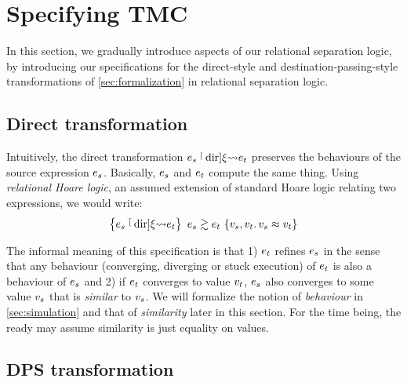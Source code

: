 \section{Specifying TMC}
\label{sec:specification}

In this section, we gradually introduce aspects of our relational separation logic, by introducing our specifications for the direct-style and destination-passing-style transformations of \cref{sec:formalization} in relational separation logic.

\subsection{Direct transformation}

Intuitively, the direct transformation $\datalangExpr_s \tmcDir{\datalangRenaming} \datalangExpr_t$ preserves the behaviours of the source expression $\datalangExpr_s$.
Basically, $\datalangExpr_s$ and $\datalangExpr_t$ compute the same thing.
Using \emph{relational Hoare logic}, an assumed extension of standard Hoare logic relating two expressions, we would write:
\[
    \iSimvHoare{
        \datalangExpr_s \tmcDir{\datalangRenaming} \datalangExpr_t
    }{
        \datalangVal_s, \datalangVal_t \ldotp
        \datalangVal_s \iSimilar \datalangVal_t
    }{
        \datalangExpr_s
    }{
        \datalangExpr_t
    }
\]

The informal meaning of this specification is that 1) $\datalangExpr_t$ refines $\datalangExpr_s$ in the sense that any behaviour (converging, diverging or stuck execution) of $\datalangExpr_t$ is also a behaviour of $\datalangExpr_s$ and 2) if $\datalangExpr_t$ converges to value $\datalangVal_t$, $\datalangExpr_s$ also converges to some value $\datalangVal_s$ that is \emph{similar} to $\datalangVal_s$.
We will formalize the notion of \emph{behaviour} in \cref{sec:simulation} and that of \emph{similarity} later in this section.
For the time being, the ready may assume similarity is just equality on values.

\subsection{DPS transformation}

